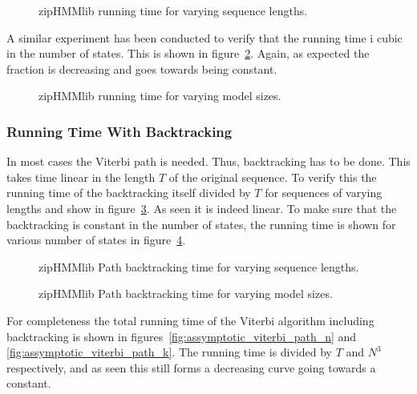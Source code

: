 \begin{figure}
  \centering
  
  \caption{zipHMMlib running time for varying sequence lengths.}
  \label{fig:assymptotic_viterbi_n}
\end{figure}

A similar experiment has been conducted to verify that the running time i cubic
in the number of states. This is shown in
figure~\ref{fig:assymptotic_viterbi_k}. Again, as expected the fraction is
decreasing and goes towards being constant.

\begin{figure}
  \centering
  
  \caption{zipHMMlib running time for varying model sizes.}
  \label{fig:assymptotic_viterbi_k}
\end{figure}

\subsubsection{Running Time With Backtracking}

In most cases the Viterbi path is needed. Thus, backtracking has to be
done. This takes time linear in the length $T$ of the original sequence. To verify
this the running time of the backtracking itself divided by $T$ for sequences
of varying lengths and show in
figure~\ref{fig:assymptotic_viterbi_backtrack_n}. As seen it is indeed
linear. To make sure that the backtracking is constant in the number of states,
the running time is shown for various number of states in
figure~\ref{fig:assymptotic_viterbi_backtrack_k}. 

\begin{figure}
  \centering
  
  \caption{zipHMMlib Path backtracking time for varying sequence lengths.}
  \label{fig:assymptotic_viterbi_backtrack_n}
\end{figure}

\begin{figure}
  \centering
  
  \caption{zipHMMlib Path backtracking time for varying model sizes.}
  \label{fig:assymptotic_viterbi_backtrack_k}
\end{figure}

For completeness the total running time of the Viterbi algorithm including
backtracking is shown in figures~\ref{fig:assymptotic_viterbi_path_n} and
\ref{fig:assymptotic_viterbi_path_k}. The running time is divided by $T$ and
$N^3$ respectively, and as seen this still forms a decreasing curve going
towards a constant.

